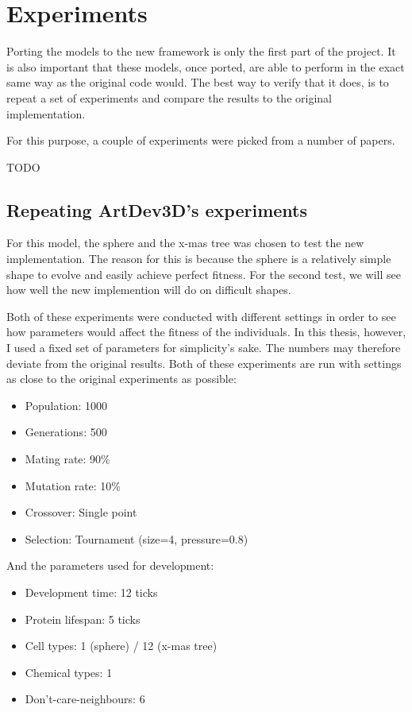 \section{Experiments}
\label{sec:experiments}
Porting the models to the new framework is only the first part of the project. It is also important that these models, once ported, are able to perform in the exact same way as the original code would. The best way to verify that it does, is to repeat a set of experiments and compare the results to the original implementation.

For this purpose, a couple of experiments were picked from a number of papers.

TODO

\subsection{Repeating ArtDev3D's experiments}
For this model, the sphere and the x-mas tree was chosen to test the new implementation. The reason for this is because the sphere is a relatively simple shape to evolve and easily achieve perfect fitness. For the second test, we will see how well the new implemention will do on difficult shapes.

Both of these experiments were conducted with different settings in order to see how parameters would affect the fitness of the individuals. In this thesis, however, I used a fixed set of parameters for simplicity's sake. The numbers may therefore deviate from the original results. Both of these experiments are run with settings as close to the original experiments as possible:

\begin{itemize}
	\itemsep=-2pt
	\item Population: 1000
	\item Generations: 500
	\item Mating rate: 90\%
	\item Mutation rate: 10\%
	\item Crossover: Single point
	\item Selection: Tournament (size=4, pressure=0.8)
\end{itemize}

And the parameters used for development:

\begin{itemize}
	\itemsep=-2pt
	\item Development time: 12 ticks
	\item Protein lifespan: 5 ticks
	\item Cell types: 1 (sphere) / 12 (x-mas tree)
	\item Chemical types: 1
	\item Don't-care-neighbours: 6
\end{itemize}

